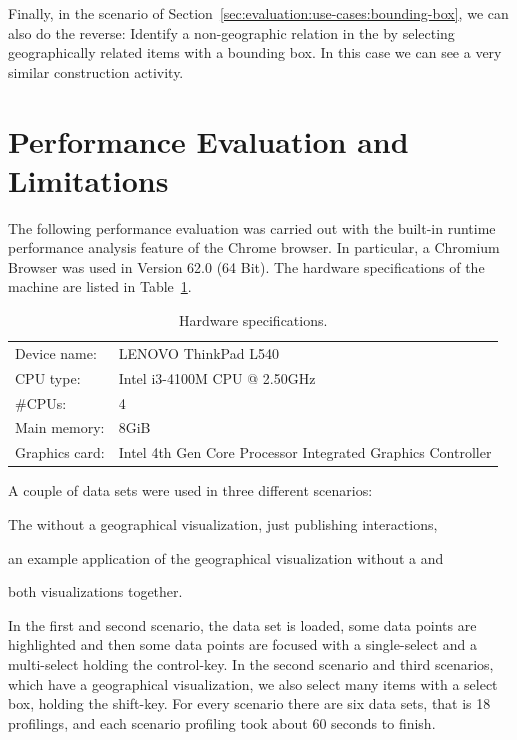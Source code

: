 Finally, in the scenario of Section~\ref{sec:evaluation:use-cases:bounding-box}, we can also do the reverse:
Identify a non-geographic relation in the \tmap{} by selecting geographically related items with a bounding box.
In this case we can see a very similar construction activity.


\section{Performance Evaluation and Limitations}

The following performance evaluation was carried out with the built-in runtime performance analysis feature of the Chrome browser.
In particular, a Chromium Browser was used in Version 62.0 (64 Bit).
The hardware specifications of the machine are listed in Table~\ref{tab:evaluation:performance:hardware}.

\begin{table}[ht]
  \centering
  \caption{Hardware specifications.}%
  \label{tab:evaluation:performance:hardware}
  \begin{tabular}{ll}
    Device name: & LENOVO ThinkPad L540 \\
    CPU type: & Intel i3-4100M CPU @ 2.50GHz \\
    \#CPUs: & 4 \\
    Main memory: & 8GiB \\
    Graphics card: & Intel 4th Gen Core Processor Integrated Graphics Controller \\
  \end{tabular}
\end{table}

A couple of data sets were used in three different scenarios:
\begin{enumerate*}[label=(\arabic*)]
  \item The \tmap{} without a geographical visualization, just publishing interactions,
  \item an example application of the geographical visualization without a \tmap{} and
  \item both visualizations together.
\end{enumerate*}

In the first and second scenario, the data set is loaded, some data points are highlighted and then some data points are focused with a single-select and a multi-select holding the control-key.
In the second scenario and third scenarios, which have a geographical visualization, we also select many items with a select box, holding the shift-key.
For every scenario there are six data sets, that is 18 profilings, and each scenario profiling took about 60 seconds to finish.

